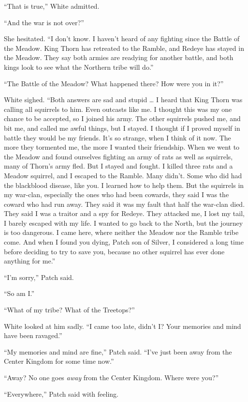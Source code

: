 \documentclass[12pt]{memoir}
\begin{document}
“That is true,” White admitted.

“And the war is not over?”

She hesitated. “I don’t know. I haven’t heard of any fighting since
the Battle of the Meadow. King Thorn has retreated to the Ramble, and
Redeye has stayed in the Meadow. They say both armies are readying for
another battle, and both kings look to see what the Northern tribe
will do.”

“The Battle of the Meadow? What happened there? How were you in it?”

White sighed. “Both answers are sad and stupid … I heard that King
Thorn was calling all squirrels to him. Even outcasts like me. I
thought this was my one chance to be accepted, so I joined his
army. The other squirrels pushed me, and bit me, and called me awful
things, but I stayed. I thought if I proved myself in battle they
would be my friends. It’s so strange, when I think of it now. The more
they tormented me, the more I wanted their friendship. When we went to
the Meadow and found ourselves fighting an army of rats as well as
squirrels, many of Thorn’s army fled. But I stayed and fought. I
killed three rats and a Meadow squirrel, and I escaped to the
Ramble. Many didn’t. Some who did had the blackblood disease, like
you. I learned how to help them. But the squirrels in my war-clan,
especially the ones who had been cowards, they said I was the coward
who had run away. They said it was my fault that half the war-clan
died. They said I was a traitor and a spy for Redeye. They attacked
me, I lost my tail, I barely escaped with my life. I wanted to go back
to the North, but the journey is too dangerous. I came here, where
neither the Meadow nor the Ramble tribe come. And when I found you
dying, Patch son of Silver, I considered a long time before deciding
to try to save you, because no other squirrel has ever done anything
for me.”

“I’m sorry,” Patch said.

“So am I.”

“What of my tribe? What of the Treetops?”

White looked at him sadly. “I came too late, didn’t I? Your memories
and mind have been ravaged.”

“My memories and mind are fine,” Patch said. “I’ve just been away from
the Center Kingdom for some time now.”

“Away? No one goes \textit{away} from the Center Kingdom. Where were
you?”

“Everywhere,” Patch said with feeling.
\end{document}
